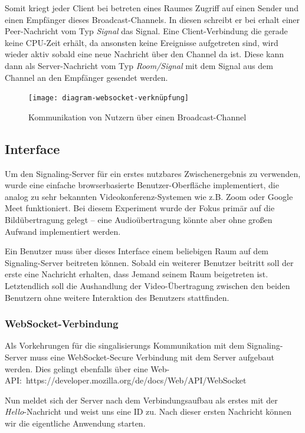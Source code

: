 \documentclass{IEEEtran}
\begin{document}
\begin{twocolumn}
Somit kriegt jeder Client bei betreten eines Raumes Zugriff auf einen Sender
und einen Empfänger dieses Broadcast-Channels. In diesen schreibt er bei erhalt
einer Peer-Nachricht vom Typ \textit{Signal} das Signal. Eine Client-Verbindung
die gerade keine CPU-Zeit erhält, da ansonsten keine Ereignisse aufgetreten
sind, wird wieder aktiv sobald eine neue Nachricht über den Channel da ist.
Diese kann dann als Server-Nachricht vom Typ \textit{Room/Signal} mit dem
Signal aus dem Channel an den Empfänger gesendet werden.

\begin{figure}[ht]
	\texttt{[image: diagram-websocket-verknüpfung]}
	\centering
	\caption{Kommunikation von Nutzern über einen Broadcast-Channel}
\end{figure}

\subsection{Interface}

Um den Signaling-Server für ein erstes nutzbares Zwischenergebnis zu verwenden,
wurde eine einfache browserbasierte Benutzer-Oberfläche implementiert, die
analog zu sehr bekannten Videokonferenz-Systemen wie z.B. Zoom oder Google Meet
funktioniert. Bei diesem Experiment wurde der Fokus primär auf die
Bildübertragung gelegt – eine Audioübertragung könnte aber ohne großen Aufwand
implementiert werden.

Ein Benutzer muss über dieses Interface einem beliebigen Raum auf dem
Signaling-Server beitreten können. Sobald ein weiterer Benutzer beitritt soll
der erste eine Nachricht erhalten, dass Jemand seinem Raum beigetreten ist.
Letztendlich soll die Aushandlung der Video-Übertragung zwischen den beiden
Benutzern ohne weitere Interaktion des Benutzers stattfinden.

\subsubsection{WebSocket-Verbindung}

Als Vorkehrungen für die singalisierungs Kommunikation mit dem Signaling-Server
muss eine WebSocket-Secure Verbindung mit dem Server aufgebaut werden. Dies
gelingt ebenfalls über eine Web-API:\
https://developer.mozilla.org/de/docs/Web/API/WebSocket

Nun meldet sich der Server nach dem Verbindungsaufbau als erstes mit der
\textit{Hello}-Nachricht und weist uns eine ID zu. Nach dieser ersten Nachricht
können wir die eigentliche Anwendung starten.


\end{twocolumn}
\end{document}
